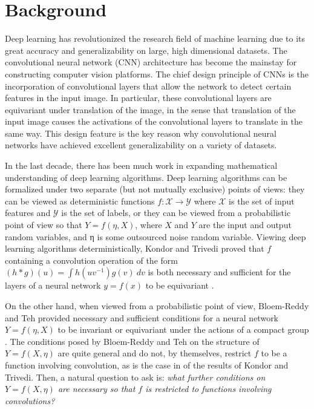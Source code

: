 

\section{Background}
Deep learning has revolutionized the research field of machine learning due to its great accuracy and generalizability on large, high dimensional datasets. 
The convolutional neural network (CNN) architecture has become the mainstay for constructing computer vision platforms. 
The chief design principle of CNNs is the incorporation of convolutional layers that allow the network to detect certain features in the input
image. 
In particular, these convolutional layers are equivariant under translation of the image, in the sense that translation of the input image causes the activations of the convolutional layers to translate in the same way. 
This design feature is the key reason why convolutional neural networks have achieved excellent generalizability on a variety of datasets.

In the last decade, there has been much work in expanding mathematical understanding of deep learning algorithms. 
Deep learning algorithms can be formalized under two separate (but not mutually exclusive) points of views: they can be viewed as deterministic functions $f : \mathcal{X} \to \mathcal{Y}$ where $\mathcal{X}$ is the set of input features and $\mathcal{Y}$ is the set of labels, or they can be viewed from a probabilistic point of view so that $Y = f(\eta,X)$, where $X$ and $Y$ are the input and output random variables, and η is some outsourced noise random variable.
Viewing deep learning algorithms deterministically, Kondor and Trivedi proved that $f$ containing a convolution operation of the form $(h * g)(u) = \int h(uv^{-1})g(v)\ dv$ is both necessary and sufficient for the layers of a neural network
$y = f(x)$ to be equivariant \cite{kondor2018generalization}. 

On the other hand, when viewed from a probabilistic point of view, Bloem-Reddy and Teh provided necessary and sufficient conditions for a neural network $Y = f(\eta,X)$ to be invariant or equivariant under the actions of a compact group \cite{bloemreddy2019probabilistic}.
The conditions posed by Bloem-Reddy and Teh on the structure of $Y = f(X, \eta)$ are quite general and do not, by themselves, restrict $f$ to be a function involving convolution, as is the case in of the results of Kondor and Trivedi. 
Then, a natural question to ask is: \textit{what further conditions on $Y = f(X, \eta)$ are necessary so that $f$ is restricted to functions involving convolutions?}

